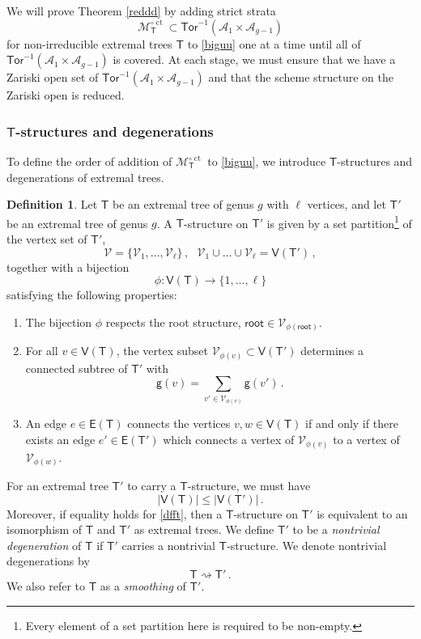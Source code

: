 \documentclass[11pt]{amsart}
\theoremstyle{definition}
\newtheorem{definition}[thm]{Definition}
\newcommand{\M}{\mathcal{M}}
\newcommand{\A}{\mathcal{A}}
\DeclareMathOperator{\ct}{ct}
\newcommand{\Tor}{\mathsf{Tor}}
\begin{document}
{We will prove Theorem \ref{reddd} by adding strict strata 
 $$\M_\mathsf{T}^{\circ \ct} \subset  \Tor^{-1}(\A_1\times \A_{g-1})$$
 for non-irreducible extremal trees $\mathsf{T}$
to \eqref{biguu}
one at a time until all of $\Tor^{-1}(\A_1\times \A_{g-1})$ is covered.
At each stage, we must ensure that we have a Zariski open
set of  $\Tor^{-1}(\A_1\times \A_{g-1})$ and that the
scheme structure on the Zariski open is reduced.


\subsubsection{$\mathsf{T}$-structures and degenerations} \label{tstd}
To define the order of addition of $\M_\mathsf{T}^{\circ \ct}$ to \eqref{biguu},
we introduce 
$\mathsf{T}$-structures and 
degenerations
of extremal trees.
\begin{definition}\label{defdef}
Let $\mathsf{T}$ be an extremal
tree of genus $g$ with $\ell$ vertices,
and let 
$\mathsf{T}'$ be an extremal tree of genus $g$. 
A $\mathsf{T}$-structure on $\mathsf{T}'$
is given by a set
partition{\footnote{Every element of
a set partition here is required to be non-empty.}}
of the vertex set of $\mathsf{T}'$,
$$ \mathcal{V}=\{\mathcal{V}_1, \ldots, \mathcal{V}_\ell\}\, , \ \ \
\mathcal{V}_1\cup  \ldots \cup 
\mathcal{V}_\ell =\mathsf{V}({\mathsf{T}'})\, ,$$
together with a bijection
$$\phi: \mathsf{V}(\mathsf{T}) \rightarrow
\{1,\ldots,\ell\}$$
satisfying the following properties:
\begin{enumerate}
\item[(i)] The bijection
$\phi$ respects the root structure, 
$\mathsf{root}\in \mathcal{V}_{\phi(\mathsf{root})}$.
\item[(ii)] 
For all $v\in \mathsf{V}(\mathsf{T})$,
the vertex subset
$\mathcal{V}_{\phi(v)}\subset \mathsf{V}(\mathsf{T}')$
determines a connected subtree of
$\mathsf{T}'$ with
$$\mathsf{g}(v)= \sum_{v'\in
\mathcal{V}_{\phi(v)}} \mathsf{g}(v')\, .
$$
\item[(iii)] An edge $e\in \mathsf{E}(\mathsf{T})$ connects the vertices
$v,w\in \mathsf{V}(\mathsf{T})$ if and only
if there exists an edge $e'\in \mathsf{E}(\mathsf{T}')$ which connects a vertex
of $\mathcal{V}_{\phi(v)}$ to a vertex
of $\mathcal{V}_{\phi(w)}$.
\end{enumerate}

\end{definition}


For an extremal tree $\mathsf{T}'$ to carry a $\mathsf{T}$-structure, we must have
\begin{equation}\label{dfft}
|\mathsf{V}(\mathsf{T})| \leq |\mathsf{V}(\mathsf{T}')|\, .
\end{equation}
Moreover, if equality holds for \eqref{dfft},
then a $\mathsf{T}$-structure on $\mathsf{T}'$ is equivalent to an
isomorphism of 
$\mathsf{T}$ and $\mathsf{T}'$ as
extremal trees.
We define $\mathsf{T}'$ to be a {\em nontrivial degeneration} of $\mathsf{T}$ 
if
$\mathsf{T}'$ carries a nontrivial $\mathsf{T}$-structure. We denote
nontrivial degenerations by
$$\mathsf{T} \rightsquigarrow \mathsf{T}'\, .$$
We also refer to $\mathsf{T}$ as a \emph{smoothing} of $\mathsf{T}'$.

}
\end{document}
